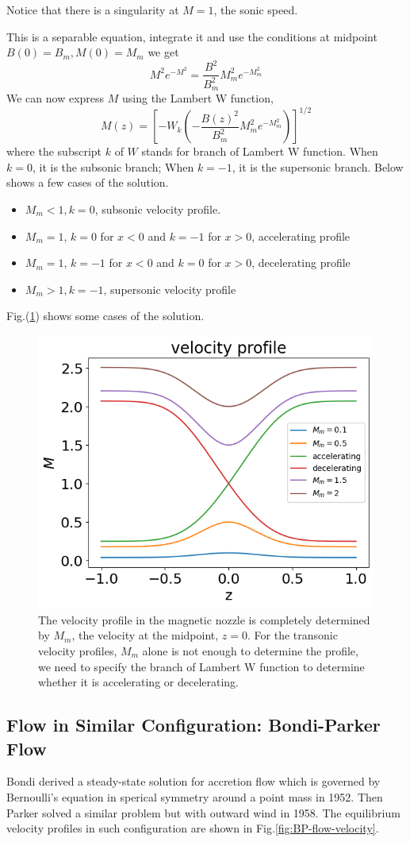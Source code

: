 Notice that there is a singularity at $M=1$, the sonic speed.

This is a separable equation, integrate it and use the conditions at midpoint $B(0)=B_m, M(0)=M_m$ we get
\[ M^2e^{-M^2} = \frac{B^2}{B_m^2}M_m^2e^{-M_m^2} \]
We can now express $M$ using the Lambert W function,
\[ M(z) = \left[ -W_k\left(-\frac{B(z)^2}{B_m^2}M_m^2e^{-M_m^2}\right) \right]^{1/2} \]
where the subscript $k$ of $W$ stands for branch of Lambert W function. When $k=0$, it is the subsonic branch; When $k=-1$, it is the supersonic branch. Below shows a few cases of the solution.
\begin{itemize}
	\item $M_m < 1, k=0$, subsonic velocity profile.
	\item $M_m = 1$, $k=0$ for $x<0$ and $k=-1$ for $x>0$, accelerating profile
	\item $M_m = 1$, $k=-1$ for $x<0$ and $k=0$ for $x>0$, decelerating profile
	\item $M_m > 1, k=-1$, supersonic velocity profile
\end{itemize}
 Fig.(\ref{fig:velocity_profiles}) shows some cases of the solution.
\begin{figure}[H]
	\centering
	\includegraphics[width=0.7\linewidth]{../../thesis/img/introduction/velocity-profiles}
	\caption{The velocity profile in the magnetic nozzle is completely determined by $M_m$, the velocity at the midpoint, $z=0$. For the transonic velocity profiles, $M_m$ alone is not enough to determine the profile, we need to specify the branch of Lambert W function to determine whether it is accelerating or decelerating.}
	\label{fig:velocity_profiles}
\end{figure}

\subsection{Flow in Similar Configuration: Bondi-Parker Flow}
Bondi derived a steady-state solution for accretion flow which is governed by Bernoulli's equation in sperical symmetry around a point mass in 1952. Then Parker solved a similar problem but with outward wind in 1958. \cite{aikawa_stability_1979,bondi_spherically_1952,keto_stability_2020} The equilibrium velocity profiles in such configuration are shown in Fig.\ref{fig:BP-flow-velocity}.

